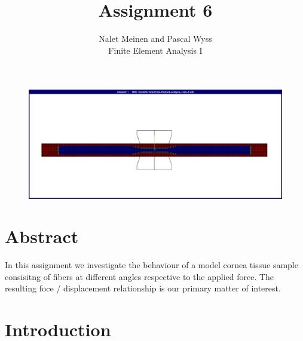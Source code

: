 \documentclass[12pt]{article}
\begin{document}


\title{Assignment 6}%
\author{Nalet Meinen and Pascal Wyss\\ %
Finite Element Analysis I
}
\maketitle

\begin{figure}[!htb]
  \centering
  \vspace*{1cm}
  \includegraphics[trim={2cm 2cm 2cm 2cm},clip,width=1.0\linewidth]{pics/titelbild}
  \label{fig:0}
\end{figure}

\newpage

\section*{Abstract}
In this assignment we investigate the behaviour of a model cornea tissue sample consisitng of fibers at different angles
respective to the applied force. The resulting foce / displacement relationship is our primary
matter of interest.


\tableofcontents
\pagebreak
\section{Introduction}
\end{document}

